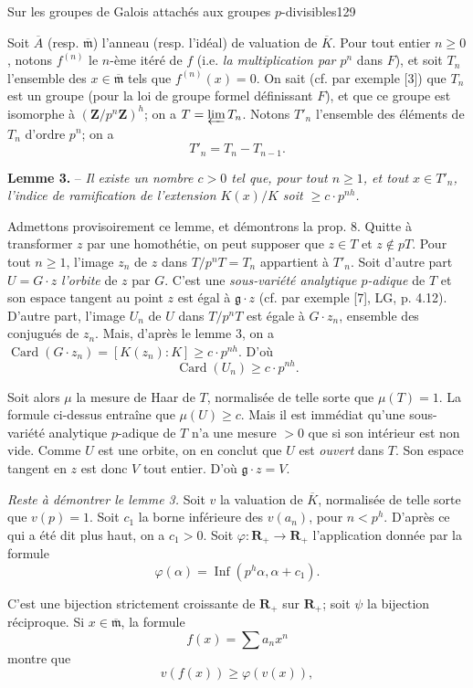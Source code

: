 Sur les groupes de Galois attachés aux groupes $p$-divisibles\hfill 129

Soit $\overline A$ (resp. $\overline{\mathfrak m}$) l'anneau (resp. l'idéal) de valuation de $\overline K$. Pour tout entier $n\geq0$, notons $f^{(n)}$ le $n$-ème itéré de $f$ (i.e. \textit{la multiplication par $p^n$} dans $F$), et soit $T_n$ l'ensemble des $x\in\overline{\mathfrak m}$ tels que $f^{(n)}(x)=0$. On sait (cf. par exemple [3]) que $T_n$ est un groupe (pour la loi de groupe formel définissant $F$), et que ce groupe est isomorphe à $(\mathbf Z/p^n\mathbf Z)^h$; on a $T=\varprojlim T_n$. Notons $T'_n$ l'ensemble des éléments de $T_n$ d'ordre $p^n$; on a
\[
T'_n=T_n-T_{n-1}.
\]

\textbf{Lemme 3.} -- \textit{Il existe un nombre $c>0$ tel que, pour tout $n\geq1$, et tout $x\in T'_n$, l'indice de ramification de l'extension $K(x)/K$ soit $\geq c\cdot p^{nh}$.}

Admettons provisoirement ce lemme, et démontrons la prop. 8. Quitte à transformer $z$ par une homothétie, on peut supposer que $z\in T$ et $z\notin pT$. Pour tout $n\geq1$, l'image $z_n$ de $z$ dans $T/p^nT=T_n$ appartient à $T'_n$. Soit d'autre part $U=G\cdot z$ \textit{l'orbite} de $z$ par $G$. C'est une \textit{sous-variété analytique $p$-adique} de $T$ et son espace tangent au point $z$ est égal à $\mathfrak g\cdot z$ (cf. par exemple [7], LG, p. 4.12). D'autre part, l'image $U_n$ de $U$ dans $T/p^nT$ est égale à $G\cdot z_n$, ensemble des conjugués de $z_n$. Mais, d'après le lemme 3, on a $\operatorname{Card}(G\cdot z_n)=[K(z_n):K]\geq c\cdot p^{nh}$. D'où
\[
\operatorname{Card}(U_n)\geq c\cdot p^{nh}.
\]

Soit alors $\mu$ la mesure de Haar de $T$, normalisée de telle sorte que $\mu(T)=1$. La formule ci-dessus entraîne que $\mu(U)\geq c$. Mais il est immédiat qu'une sous-variété analytique $p$-adique de $T$ n'a une mesure $>0$ que si son intérieur est non vide. Comme $U$ est une orbite, on en conclut que $U$ est \textit{ouvert} dans $T$. Son espace tangent en $z$ est donc $V$ tout entier. D'où $\mathfrak g\cdot z=V$.

\textit{Reste à démontrer le lemme 3.} Soit $v$ la valuation de $\overline K$, normalisée de telle sorte que $v(p)=1$. Soit $c_1$ la borne inférieure des $v(a_n)$, pour $n<p^h$. D'après ce qui a été dit plus haut, on a $c_1>0$. Soit $\varphi:\mathbf R_+\to\mathbf R_+$ l'application donnée par la formule
\[
\varphi(\alpha)=\operatorname{Inf}(p^h\alpha,\alpha+c_1).
\]

C'est une bijection strictement croissante de $\mathbf R_+$ sur $\mathbf R_+$; soit $\psi$ la bijection réciproque. Si $x\in\overline{\mathfrak m}$, la formule
\[
f(x)=\sum a_nx^n
\]
montre que
\[
v(f(x))\geq\varphi(v(x)),
\]
